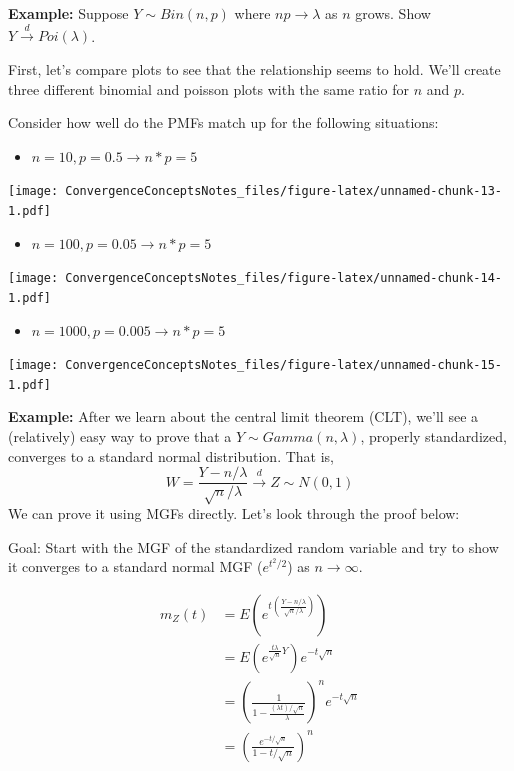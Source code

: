 \documentclass[
]{article}
\providecommand{\tightlist}{%
  \setlength{\itemsep}{0pt}\setlength{\parskip}{0pt}}
\begin{document}
\textbf{Example:} Suppose \(Y\sim Bin(n,p)\) where
\(np \rightarrow \lambda\) as \(n\) grows. Show
\(Y\stackrel{d}\rightarrow Poi(\lambda)\).

First, let's compare plots to see that the relationship seems to hold.
We'll create three different binomial and poisson plots with the same
ratio for \(n\) and \(p\).

Consider how well do the PMFs match up for the following situations:

\begin{itemize}
\tightlist
\item
  \(n = 10, p = 0.5 \rightarrow n*p = 5\)
\end{itemize}

\texttt{[image: ConvergenceConceptsNotes\_files/figure-latex/unnamed-chunk-13-1.pdf]}

\begin{itemize}
\tightlist
\item
  \(n = 100, p = 0.05 \rightarrow n*p = 5\)
\end{itemize}

\texttt{[image: ConvergenceConceptsNotes\_files/figure-latex/unnamed-chunk-14-1.pdf]}

\begin{itemize}
\tightlist
\item
  \(n = 1000, p = 0.005 \rightarrow n*p = 5\)
\end{itemize}

\texttt{[image: ConvergenceConceptsNotes\_files/figure-latex/unnamed-chunk-15-1.pdf]}

\textbf{Example:} After we learn about the central limit theorem (CLT),
we'll see a (relatively) easy way to prove that a
\(Y\sim Gamma(n, \lambda)\), properly standardized, converges to a
standard normal distribution. That is,
\[W = \frac{Y-n/\lambda}{\sqrt{n}/\lambda}\stackrel{d}{\rightarrow} Z \sim N(0,1)\]
We can prove it using MGFs directly. Let's look through the proof below:

Goal: Start with the MGF of the standardized random variable and try to
show it converges to a standard normal MGF (\(e^{t^2/2}\)) as
\(n\rightarrow\infty\).

\begin{align*} 
m_Z(t) &= E\left(e^{t\left(\frac{Y-n/\lambda}{\sqrt{n}/\lambda}\right)}\right)\\
       &= E\left(e^{\frac{t\lambda}{\sqrt{n}}Y}\right)e^{-t\sqrt{n}}\\
       &= \left(\frac{1}{1-\frac{(\lambda t)/\sqrt{n}}{\lambda}}\right)^{n}e^{-t\sqrt{n}}\\
       &= \left(\frac{e^{-t/\sqrt{n}}}{1-t/\sqrt{n}}\right)^{n}\\
\end{align*}
\end{document}
